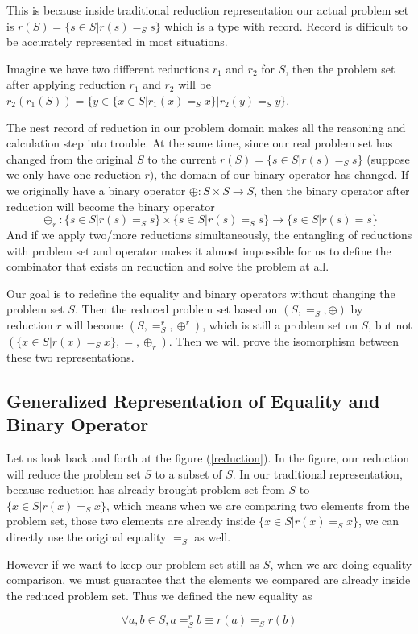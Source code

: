\documentclass[a4paper,12pt,twoside,openright]{report}
\newcommand{\e}[2]{
\begin{equation}
  \label{#1} 
  #2
\end{equation}
}
\begin{document}
This is because inside traditional reduction representation our actual problem set is $r(S) = \{s\in S|r(s)=_S s\}$ which is a type with record. Record is difficult to be accurately represented in most situations. 

Imagine we have two different reductions $r_1$ and $r_2$ for $S$, then the problem set after applying reduction $r_1$ and $r_2$ will be $r_2(r_1(S)) = \{y\in \{x \in S | r_1(x) =_S x\}|r_2(y)=_S y\}$. 

The nest record of reduction in our problem domain makes all the reasoning and calculation step into trouble. 
At the same time, since our real problem set has changed from the original $S$ to the current $r(S) = \{s\in S|r(s)=_S s\}$ (suppose we only have one reduction $r$), the domain of our binary operator has changed. If we originally have a binary operator $\oplus : S\times S \rightarrow S$, then the binary operator after reduction will become the binary operator \[\oplus_r : \{s\in S|r(s)=_S s\} \times \{s\in S|r(s)=_S s\} \rightarrow \{s\in S|r(s)= s\}\] And if we apply two/more reductions simultaneously, the entangling of reductions with problem set and operator makes it almost impossible for us to define the combinator that exists on reduction and solve the problem at all.

Our goal is to redefine the equality and binary operators without changing the problem set $S$. 
Then the reduced problem set based on $(S,=_S,\oplus)$ by reduction $r$ will become $(S,=^r_S,\oplus^r)$, which is still a problem set on $S$, but not $(\{x \in S | r(x) =_S x\}, =,\oplus_r)$. 
Then we will prove the isomorphism between these two representations.

\subsection{Generalized Representation of Equality and Binary Operator}
Let us look back and forth at the figure (\ref{reduction}). In the figure, our reduction will reduce the problem set $S$ to a subset of $S$. In our traditional representation, because reduction has already brought problem set from $S$ to $\{x \in S | r(x) =_S x\}$, which means when we are comparing two elements from the problem set, those two elements are already inside $\{x \in S | r(x) =_S x\}$, we can directly use the original equality $=_S$ as well.

However if we want to keep our problem set still as $S$, when we are doing equality comparison, we must guarantee that the elements we compared are already inside the reduced problem set. Thus we defined the new equality as
\e{gr:def:eq}{\forall a,b \in S, a =^r_S b \equiv r(a) =_S r(b)}
\end{document}

